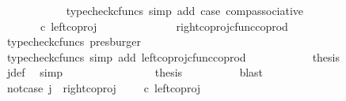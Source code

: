 \begin{isabellebody}
\ \ \ \ \ \ \ \ \ \ \isamarkupfalse%
\ {\isacharparenleft}{\kern0pt}typecheck{\isacharunderscore}{\kern0pt}cfuncs{\isacharcomma}{\kern0pt}\ simp\ add{\isacharcolon}{\kern0pt}\ case{}\ comp{\isacharunderscore}{\kern0pt}associative{}{\isacharparenright}{\kern0pt}\isanewline
\ \ \ \ \ \ \ \ \isamarkupfalse%
\ \isamarkupfalse%
\ {\isachardoublequoteopen}{\isachardot}{\kern0pt}{\isachardot}{\kern0pt}{\isachardot}{\kern0pt}\ {\isacharequal}{\kern0pt}\ {\isacharparenleft}{\kern0pt}{\isasymlangle}{\isasymt}{\isacharcomma}{\kern0pt}\ {\isasymf}{\isasymrangle}\ {\isasymamalg}{\isasymlangle}{\isasymf}{\isacharcomma}{\kern0pt}\ {\isasymt}{\isasymrangle}{\isacharparenright}{\kern0pt}\ {\isasymcirc}\isactrlsub c\ left{\isacharunderscore}{\kern0pt}coproj\ {\isasymone}\ {\isasymone}{\isachardoublequoteclose}\isanewline
\ \ \ \ \ \ \ \ \ \ \isamarkupfalse%
\ right{\isacharunderscore}{\kern0pt}coproj{\isacharunderscore}{\kern0pt}cfunc{\isacharunderscore}{\kern0pt}coprod\ \isamarkupfalse%
\ {\isacharparenleft}{\kern0pt}typecheck{\isacharunderscore}{\kern0pt}cfuncs{\isacharcomma}{\kern0pt}\ presburger{\isacharparenright}{\kern0pt}\isanewline
\ \ \ \ \ \ \ \ \isamarkupfalse%
\ \isamarkupfalse%
\ {\isachardoublequoteopen}{\isachardot}{\kern0pt}{\isachardot}{\kern0pt}{\isachardot}{\kern0pt}\ {\isacharequal}{\kern0pt}\ {\isasymlangle}{\isasymt}{\isacharcomma}{\kern0pt}\ {\isasymf}{\isasymrangle}{\isachardoublequoteclose}\isanewline
\ \ \ \ \ \ \ \ \ \ \isamarkupfalse%
\ {\isacharparenleft}{\kern0pt}typecheck{\isacharunderscore}{\kern0pt}cfuncs{\isacharcomma}{\kern0pt}\ simp\ add{\isacharcolon}{\kern0pt}\ left{\isacharunderscore}{\kern0pt}coproj{\isacharunderscore}{\kern0pt}cfunc{\isacharunderscore}{\kern0pt}coprod{\isacharparenright}{\kern0pt}\isanewline
\ \ \ \ \ \ \ \ \isamarkupfalse%
\ \isamarkupfalse%
\ {\isacharquery}{\kern0pt}thesis\isanewline
\ \ \ \ \ \ \ \ \ \ \isamarkupfalse%
\ j{\isacharunderscore}{\kern0pt}def\ \isamarkupfalse%
\ simp\isanewline
\ \ \ \ \ \ \isamarkupfalse%
\isanewline
\ \ \ \ \ \ \isamarkupfalse%
\ \isamarkupfalse%
\ {\isacharquery}{\kern0pt}thesis\isanewline
\ \ \ \ \ \ \ \ \isamarkupfalse%
\ blast\isanewline
\ \ \ \ \isamarkupfalse%
\isanewline
\ \ \ \ \ \ \isamarkupfalse%
\ not{\isacharunderscore}{\kern0pt}case{}{\isacharcolon}{\kern0pt}\ {\isachardoublequoteopen}j\ {\isasymnoteq}\ right{\isacharunderscore}{\kern0pt}coproj\ {\isasymone}\ {\isacharparenleft}{\kern0pt}{\isasymone}\ {\isasymCoprod}\ {\isasymone}{\isacharparenright}{\kern0pt}\ {\isasymcirc}\isactrlsub c\ left{\isacharunderscore}{\kern0pt}coproj\ {\isasymone}\ {\isasymone}{\isachardoublequoteclose}\isanewline

\end{isabellebody}

